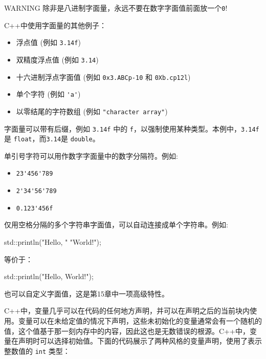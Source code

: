 \begin{myWarning}{WARNING}
除非是八进制字面量，永远不要在数字字面值前面放一个\verb|0|!
\end{myWarning}

C++中使用字面量的其他例子：

\begin{itemize}
\item
浮点值 (例如 \verb|3.14f|)

\item
双精度浮点值 (例如 \verb|3.14|)

\item
十六进制浮点字面值 (例如 \verb|0x3.ABCp-10| 和 \verb|0Xb.cp12l|)

\item
单个字符 (例如 \verb|'a'|)

\item
以零结尾的字符数组 (例如 \verb|"character array"|)
\end{itemize}

字面量可以带有后缀，例如 \verb|3.14f| 中的 \verb|f|，以强制使用某种类型。本例中，\verb|3.14f| 是 \verb|float|，而\verb|3.14|是 \verb|double|。

单引号字符可以用作数字字面量中的数字分隔符。例如:

\begin{itemize}
\item
\verb|23'456'789|

\item
\verb|2'34'56'789|

\item
\verb|0.123'456f|
\end{itemize}

仅用空格分隔的多个字符串字面值，可以自动连接成单个字符串。例如:

\begin{cpp}
std::println("Hello, "
             "World!");
\end{cpp}

等价于：

\begin{cpp}
std::println("Hello, World!");
\end{cpp}

也可以自定义字面值，这是第15章中一项高级特性。


C++中，变量几乎可以在代码的任何地方声明，并可以在声明之后的当前块内使用。变量可以在未给定值的情况下声明，这些未初始化的变量通常会有一个随机的值，这个值基于那一刻内存中的内容，因此这也是无数错误的根源。C++中，变量在声明时可以选择初始值。下面的代码展示了两种风格的变量声明，使用了表示整数值的 \verb|int| 类型：

